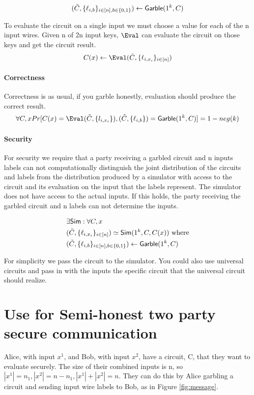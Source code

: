\[
(\tilde{C}, \{\ell_{i,b}\}_{i \in [n], b \in \{0,1\}}) \leftarrow \mathsf{Garble}(1^k, C) 
\]

To evaluate the circuit on a single input we must choose a value for each of the n input wires.
Given n of 2n input keys, $\Eval$ can evaluate the circuit on those keys and get the circuit result.
\[
C(x) \leftarrow \Eval(\tilde{C}, \{\ell_{i, x_i}\}_{i \in [n]}) 
\]

\paragraph{Correctness}
Correctness is as usual, if you garble honestly, evaluation should produce the correct result. 
\[
\forall C, x 
Pr[ C(x) = \Eval(\tilde{C}, \{l_{i, x_i}\}),  (\tilde{C}, \{\ell_{i,b}\}) = \Garble(1^k, C)] = 1 - neg(k)
\]


\paragraph{Security}
For security we require that a party receiving 
a garbled circuit and n inputs labels 
can not computationally distinguish the joint distribution of the circuits and labels
from the distribution produced by 
a simulator with access to the circuit and its evaluation on the input that the labels represent. 
The simulator does not have access to the actual inputs.
If this holds, the party receiving the garbled circuit and n labels can not determine the inputs.

\begin{align*}
&\exists \mathsf{Sim} : \forall C, x\\
&(\tilde{C}, \{\ell_{i,x_i}\}_{i \in [n]}) \simeq \mathsf{Sim}(1^k, C, C(x)) \text{ where} \\
&(\tilde{C}, \{\ell_{i,b}\}_{i \in [n], b \in \{0,1\}}) \leftarrow \mathsf{Garble}(1^k, C) 
\end{align*}

For simplicity we pass the circuit to the simulator.
You could also use universal circuits and pass 
in with the inputs the specific circuit that the universal circuit should realize. 



\section{Use for Semi-honest two party secure communication}
Alice, with input $x^1$, and Bob, with input $x^2$, have a circuit, C, that they want to evaluate securely. 
The size of their combined inputs is n, so $|x^1| = n_1, |x^2| = n - n_1, |x^1| + |x^2| = n$.
They can do this by Alice garbling a circuit and sending input wire labels to Bob, as in Figure \ref{fig:message}.

